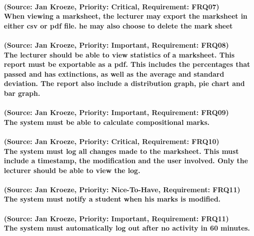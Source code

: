 \documentclass[12pt]{article}
\begin{document}
  \paragraph{(Source: Jan Kroeze, Priority: Critical, Requirement: FRQ07) \\
  When viewing a marksheet, the lecturer may export the marksheet in either csv or pdf file. he may also choose to delete the mark sheet}
  \paragraph{(Source: Jan Kroeze, Priority: Important, Requirement: FRQ08) \\
  The lecturer should be able to view statistics of a marksheet.  This report must be exportable as a pdf. This includes the percentages that passed and has extinctions, as well as the average and standard deviation. The report also include a distribution graph, pie chart and bar graph.}
  \paragraph{(Source: Jan Kroeze, Priority: Important, Requirement: FRQ09) \\
  The system must be able to calculate compositional marks.}
  \paragraph{(Source: Jan Kroeze, Priority: Critical, Requirement: FRQ10) \\
  The system must log all changes made to the marksheet. This must include a timestamp, the modification and the user involved. Only the lecturer should be able to view the log.}
  \paragraph{(Source: Jan Kroeze, Priority: Nice-To-Have, Requirement: FRQ11) \\
  The system must notify a student when his marks is modified.}
  \paragraph{(Source: Jan Kroeze, Priority: Important, Requirement: FRQ11) \\
  The system must automatically log out after no activity in 60 minutes.}
\end{document}
